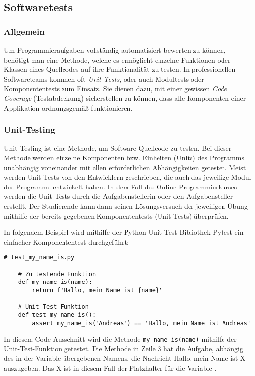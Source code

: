 \subsection{Softwaretests}
\subsubsection{Allgemein}
Um Programmieraufgaben vollständig automatisiert bewerten zu können, benötigt
man eine Methode, welche es ermöglicht einzelne Funktionen oder Klassen eines
Quellcodes auf ihre Funktionalität zu testen. In professionellen Softwareteams
kommen oft \emph{Unit-Tests}, oder auch Modultests oder Komponententests zum
Einsatz. Sie dienen dazu, mit einer gewissen \emph{Code Coverage}
(Testabdeckung) sicherstellen zu können, dass alle Komponenten einer Applikation
ordnungsgemäß funktionieren.

\subsubsection{Unit-Testing}
Unit-Testing ist eine Methode, um Software-Quellcode zu testen. Bei dieser
Methode werden einzelne Komponenten bzw. Einheiten (Units) des Programms
unabhängig voneinander mit allen erforderlichen Abhängigkeiten getestet. Meist
werden Unit-Tests von den Entwicklern geschrieben, die auch das jeweilige
Modul des Programms entwickelt haben. In dem Fall des Online-Programmierkurses
werden die Unit-Tests durch die Aufgabenstellerin oder den Aufgabensteller
erstellt. Der Studierende kann dann seinen Lösungsversuch der jeweiligen Übung
mithilfe der bereits gegebenen Komponententests (Unit-Tests) überprüfen.
\parencite{unit-test}

In folgendem Beispiel wird mithilfe der Python Unit-Test-Bibliothek Pytest
ein einfacher Komponententest durchgeführt:

\begin{lstlisting}[style=Python]
    # test_my_name_is.py

    # Zu testende Funktion
    def my_name_is(name):
        return f'Hallo, mein Name ist {name}'

    # Unit-Test Funktion
    def test_my_name_is():
        assert my_name_is('Andreas') == 'Hallo, mein Name ist Andreas'
\end{lstlisting}

In diesem Code-Ausschnitt wird die Methode \texttt{my\_name\_is(name)} mithilfe
der Unit-Test-Funktion  getestet. Die Methode 
 in Zeile 3 hat die Aufgabe, abhängig des in der
Variable  übergebenen Namens, die Nachricht \glqq Hallo, mein Name
ist X\grqq{} auszugeben. Das X ist in diesem Fall der Platzhalter für die
Variable .

